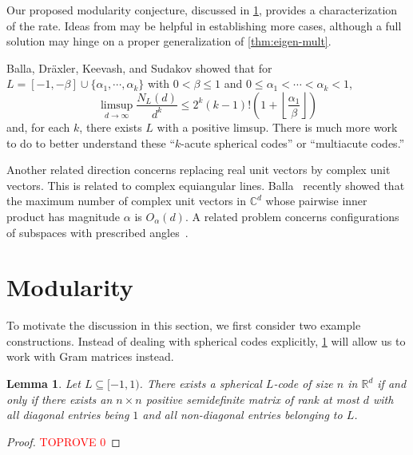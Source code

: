 \documentclass[reqno, 11pt]{amsart}
\newtheorem{lemma}[theorem]{Lemma}
\theoremstyle{definition}
\theoremstyle{remark}
\newcommand{\floor}[1]{\left\lfloor #1 \right\rfloor}
\newcommand{\paren}[1]{\left( #1 \right)}
\newcommand{\CC}{\mathbb{C}}
\newcommand{\RR}{\mathbb{R}}
\begin{document}
Our proposed modularity conjecture, discussed in \cref{sec:modularity}, provides a characterization of the rate.
Ideas from \cite{BDKS18,JP20,JP21+,JTYZZ23} may be helpful in establishing more cases, although a full solution may hinge on a proper generalization of \cref{thm:eigen-mult}.

Balla, Dr\"{a}xler, Keevash, and Sudakov \cite{BDKS18} showed that for $L = [-1, -\beta] \cup \{\alpha_1, \cdots, \alpha_k\}$ with $0 < \beta \leq 1$ and $0 \leq \alpha_1 < \cdots < \alpha_k < 1$,
\[
\limsup_{d \to \infty} \frac{N_L(d)}{d^k} \leq 2^k(k-1)!\paren{1 + \floor{\frac{\alpha_1}{\beta}}}
\]
and, for each $k$, there exists $L$ with a positive limsup.
There is much more work to do to better understand these ``$k$-acute spherical codes'' or ``multiacute codes.''

Another related direction concerns replacing real unit vectors by complex unit vectors. This is related to complex equiangular lines. 
Balla~\cite{Bal21+} recently showed that the maximum number of complex unit vectors in $\CC^d$ whose pairwise inner product has magnitude $\alpha$ is $O_\alpha(d)$. 
A related problem concerns configurations of subspaces with prescribed angles~\cite{LS73subspace,BS19}.




\section{Modularity}\label{sec:modularity}

To motivate the discussion in this section, we first consider two example constructions. Instead of dealing with spherical codes explicitly, \cref{lem:gram} will allow us to work with Gram matrices instead. 

\begin{lemma}\label{lem:gram}
	Let $L \subseteq [-1,1)$. There exists a spherical $L$-code of size $n$ in $\RR^d$ if and only if there exists an $n \times n$ positive semidefinite matrix of rank at most $d$ with all diagonal entries being $1$ and all non-diagonal entries belonging to $L$.
\end{lemma}

\begin{proof}\textcolor{red}{TOPROVE 0}\end{proof}
\end{document}
